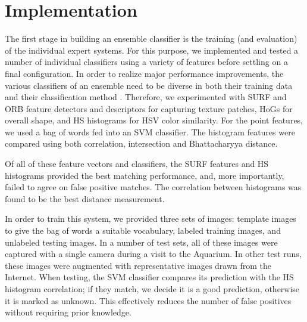 \documentclass[10pt,twocolumn,letterpaper]{article}
\begin{document}
\section{Implementation}
  The first stage in building an ensemble classifier is the training (and evaluation) of the individual expert systems. For this purpose, we implemented and tested a number of individual classifiers using a variety of features before settling on a final configuration. In order to realize major performance improvements, the various classifiers of an ensemble need to be diverse in both their training data and their classification method \cite{rokach2010ensemble}. Therefore, we experimented with SURF \cite{bay2006surf} and ORB \cite{rublee2011orb} feature detectors and descriptors for capturing texture patches, HoGs \cite{dalal2005histograms} for overall shape, and HS histograms \cite{stricker1995similarity} for HSV color similarity. For the point features, we used a bag of words \cite{csurka2004visual} fed into an SVM classifier. The histogram features were compared using both correlation, intersection and Bhattacharyya \cite{bhattacharyya1943distance} distance.
  
  Of all of these feature vectors and classifiers, the SURF features and HS histograms provided the best matching performance, and, more importantly, failed to agree on false positive matches. The correlation between histograms was found to be the best distance measurement.
  
  In order to train this system, we provided three sets of images: template images to give the bag of words a suitable vocabulary, labeled training images, and unlabeled testing images. In a number of test sets, all of these images were captured with a single camera during a visit to the Aquarium. In other test runs, these images were augmented with representative images drawn from the Internet. When testing, the SVM classifier compares its prediction with the HS histogram correlation; if they match, we decide it is a good prediction, otherwise it is marked as unknown. This effectively reduces the number of false positives without requiring prior knowledge.
  
\end{document}
